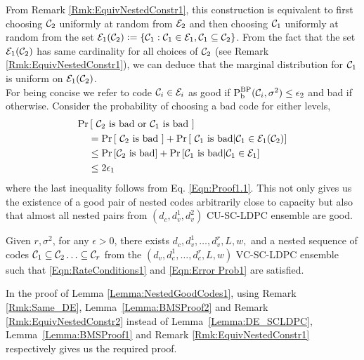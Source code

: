 \documentclass[journal,twocolumn]{IEEEtran}
\begin{document}
\begin{IEEEproof}
 From Remark \ref{Rmk:EquivNestedConstr1}, this construction is equivalent to first choosing $\mathcal{C}_{2}$ uniformly at random from $\mathcal{E}_{2}$ and then choosing $\mathcal{C}_{1}$ uniformly at random from the set $\mathcal{E}_{1}(\mathcal{C}_{2})\mathrel{\mathop:}= \{\mathcal{C}_{1}:\mathcal{C}_{1}\in \mathcal{E}_{1},\mathcal{C}_{1}\subseteq \mathcal{C}_{2}\}$. From the fact that the set $\mathcal{E}_{1}(\mathcal{C}_{2})$ has same cardinality for all choices of $\mathcal{C}_{2}$ (see Remark \ref{Rmk:EquivNestedConstr1}), we can deduce that the marginal distribution for $\mathcal{C}_{1}$ is uniform on $\mathcal{E}_{1}(\mathcal{C}_{2})$.\\
 For being concise we refer to code $\mathcal{C}_{i}\in\mathcal{E}_{i}$ as good if $\text{P}_{\text{b}}^{\text{BP}}(\mathcal{C}_{i},\sigma^{2})\leq \epsilon_{2}$ and bad if otherwise. Consider the probability of choosing a bad code for either levels,
 \begin{align*}
\text{Pr}&\left[~ \mathcal{C}_{2}  \text{ is bad  or } \mathcal{C}_{1} \text{ is bad }\right] \\
&=\text{Pr}\left[~\mathcal{C}_{2} \text{ is bad } \right] +\text{Pr}\left[~\mathcal{C}_{1} \text{ is bad} \middle\vert \mathcal{C}_{1} \in \mathcal{E}_{1}(\mathcal{C}_{2}) \right] \\
&\leq \text{Pr}\left[\mathcal{C}_{2} \text{ is bad} \right] +\text{Pr}\left[\mathcal{C}_{1} \text{ is bad}\middle\vert \mathcal{C}_{1} \in \mathcal{E}_{1}\right] \\
&\leq 2\epsilon_{1}
 \end{align*}
 where the last inequality follows from%
 Eq. \eqref{Eqn:Proof1.1}. This not only gives us the existence of a good pair of nested codes arbitrarily close to capacity but also that almost all nested pairs from $(d_{c},d_{v}^{1},d_{v}^{2})$ CU-SC-LDPC ensemble are good.
\end{IEEEproof}

\begin{lemma}\label{Lemma:NestedGoodCodes2}
Given $r,\sigma^{2}$, for any $\epsilon>0$, there exists $d_{c},d_{v}^{1},\ldots, d_{v}^{r},L,w,$ and a nested sequence of codes $\mathcal{C}_{1}\subseteq \mathcal{C}_{2}\ldots \subseteq\mathcal{C}_{r}$ from the $(d_{v},d_{c}^{1},\ldots,d_{c}^{r},L,w)$ VC-SC-LDPC ensemble such that \eqref{Eqn:RateConditions1} and \eqref{Eqn:Error Prob1} are satisfied.
\end{lemma}
	\begin{IEEEproof}
In the proof of Lemma \ref{Lemma:NestedGoodCodes1}, using Remark \ref{Rmk:Same_DE}, Lemma~\ref{Lemma:BMSProof2} and Remark \ref{Rmk:EquivNestedConstr2}  instead of  Lemma~\ref{Lemma:DE_SCLDPC}, Lemma~\ref{Lemma:BMSProof1} and Remark \ref{Rmk:EquivNestedConstr1} respectively gives us the required proof.	
\end{IEEEproof}
\end{document}
